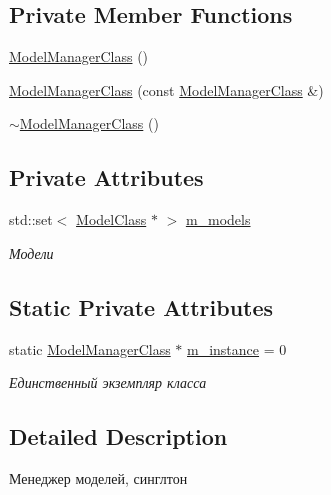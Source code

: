 \subsection*{Private Member Functions}
\begin{DoxyCompactItemize}
\item 
\hyperlink{class_model_manager_class_a4399d22fcc13ad0abd72a4a97dcca86e}{Model\+Manager\+Class} ()
\item 
\hyperlink{class_model_manager_class_ab3cdcdb49f80e90729f2b1ddf31a7d44}{Model\+Manager\+Class} (const \hyperlink{class_model_manager_class}{Model\+Manager\+Class} \&)
\item 
\hyperlink{class_model_manager_class_a962f88e5d5361bcc658dea0335db26ae}{$\sim$\+Model\+Manager\+Class} ()
\end{DoxyCompactItemize}
\subsection*{Private Attributes}
\begin{DoxyCompactItemize}
\item 
std\+::set$<$ \hyperlink{class_model_class}{Model\+Class} $\ast$ $>$ \hyperlink{class_model_manager_class_a109a3dfae693a84bdcc6f9ad699485bf}{m\+\_\+models}
\begin{DoxyCompactList}\small\item\em Модели \end{DoxyCompactList}\end{DoxyCompactItemize}
\subsection*{Static Private Attributes}
\begin{DoxyCompactItemize}
\item 
static \hyperlink{class_model_manager_class}{Model\+Manager\+Class} $\ast$ \hyperlink{class_model_manager_class_af3a7d3a7dfb708c57ce9160f8917c00a}{m\+\_\+instance} = 0
\begin{DoxyCompactList}\small\item\em Единственный экземпляр класса \end{DoxyCompactList}\end{DoxyCompactItemize}


\subsection{Detailed Description}
Менеджер моделей, синглтон 

